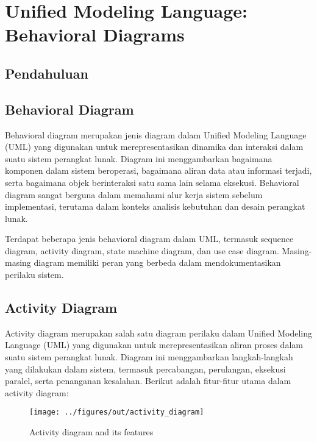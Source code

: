 \chapter{Unified Modeling Language: Behavioral Diagrams}

\section{Pendahuluan}


\section{Behavioral Diagram}

Behavioral diagram merupakan jenis diagram dalam Unified Modeling Language (UML) yang digunakan untuk merepresentasikan dinamika dan interaksi dalam suatu sistem perangkat lunak. Diagram ini menggambarkan bagaimana komponen dalam sistem beroperasi, bagaimana aliran data atau informasi terjadi, serta bagaimana objek berinteraksi satu sama lain selama eksekusi. Behavioral diagram sangat berguna dalam memahami alur kerja sistem sebelum implementasi, terutama dalam konteks analisis kebutuhan dan desain perangkat lunak.

Terdapat beberapa jenis behavioral diagram dalam UML, termasuk sequence diagram, activity diagram, state machine diagram, dan use case diagram. Masing-masing diagram memiliki peran yang berbeda dalam mendokumentasikan perilaku sistem.


\section{Activity Diagram}

Activity diagram merupakan salah satu diagram perilaku dalam Unified Modeling Language (UML) yang digunakan untuk merepresentasikan aliran proses dalam suatu sistem perangkat lunak. Diagram ini menggambarkan langkah-langkah yang dilakukan dalam sistem, termasuk percabangan, perulangan, eksekusi paralel, serta penanganan kesalahan. Berikut adalah fitur-fitur utama dalam activity diagram:


\begin{figure}[ht]
		\centering
		\texttt{[image: ../figures/out/activity\_diagram]}
		\caption{Activity diagram and its features}
		\label{fig:activity_diagram}
\end{figure}

